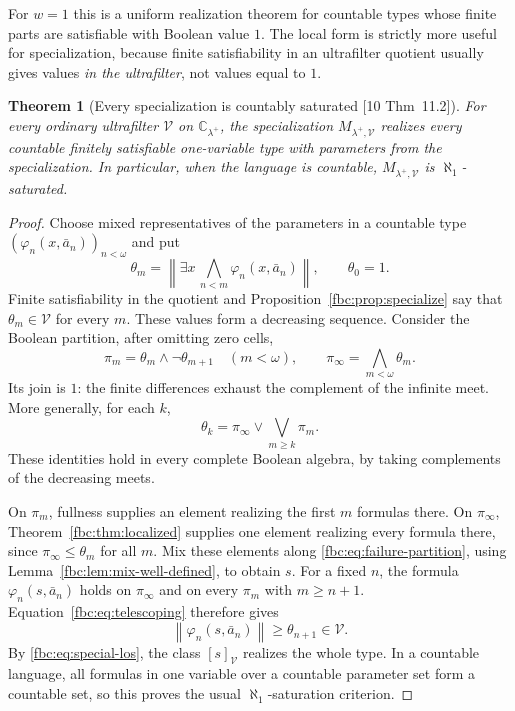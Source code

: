 \documentclass[11pt,letterpaper]{article}
\newtheorem{theorem}{Theorem}[section]
\theoremstyle{definition}
\theoremstyle{remark}
\newcommand{\om}{\omega}
\newcommand{\C}{\mathbb C}
\newcommand{\cV}{\mathcal V}
\newcommand{\truth}[1]{\left\lVert #1\right\rVert}
\newcommand{\src}[1]{\textup{[#1]}}
\begin{document}
For $w=1$ this is a uniform realization theorem for countable types whose
finite parts are satisfiable with Boolean value $1$. The local form is
strictly more useful for specialization, because finite satisfiability
in an ultrafilter quotient usually gives values \emph{in the ultrafilter},
not values equal to $1$.

\begin{theorem}[Every specialization is countably saturated \src{10 Thm~11.2}]
\label{fbc:thm:saturated}
For every ordinary ultrafilter $\cV$ on $\C_{\lambda^+}$, the
specialization $M_{\lambda^+,\cV}$ realizes every countable finitely
satisfiable one-variable type with parameters from the specialization.
In particular, when the language is countable, $M_{\lambda^+,\cV}$ is
$\aleph_1$-saturated.
\end{theorem}
\begin{proof}
Choose mixed representatives of the parameters in a countable type
$(\varphi_n(x,\bar a_n))_{n<\om}$ and put
\[
 \theta_m=\truth{\exists x\,\bigwedge_{n<m}\varphi_n(x,\bar a_n)},
 \qquad \theta_0=1.
\]
Finite satisfiability in the quotient and
Proposition~\ref{fbc:prop:specialize} say that $\theta_m\in\cV$ for every
$m$. These values form a decreasing sequence. Consider the Boolean
partition, after omitting zero cells,
\begin{equation}\label{fbc:eq:failure-partition}
 \pi_m=\theta_m\wedge\neg\theta_{m+1}\quad(m<\om),
 \qquad \pi_\infty=\bigwedge_{m<\om}\theta_m.
\end{equation}
Its join is $1$: the finite differences exhaust the complement of the
infinite meet. More generally, for each $k$,
\begin{equation}\label{fbc:eq:telescoping}
 \theta_k=\pi_\infty\vee\bigvee_{m\geq k}\pi_m.
\end{equation}
These identities hold in every complete Boolean algebra, by taking
complements of the decreasing meets.

On $\pi_m$, fullness supplies an element realizing the first $m$
formulas there. On $\pi_\infty$, Theorem~\ref{fbc:thm:localized}
supplies one element realizing every formula there, since
$\pi_\infty\leq\theta_m$ for all $m$. Mix these elements along
\eqref{fbc:eq:failure-partition}, using
Lemma~\ref{fbc:lem:mix-well-defined}, to obtain $s$. For a fixed $n$,
the formula $\varphi_n(s,\bar a_n)$ holds on $\pi_\infty$ and on every
$\pi_m$ with $m\geq n+1$. Equation~\eqref{fbc:eq:telescoping} therefore
gives
\[
 \truth{\varphi_n(s,\bar a_n)}\geq\theta_{n+1}\in\cV.
\]
By \eqref{fbc:eq:special-los}, the class $[s]_\cV$ realizes the whole
type. In a countable language, all formulas in one variable over a
countable parameter set form a countable set, so this proves the usual
$\aleph_1$-saturation criterion.
\end{proof}
\end{document}
